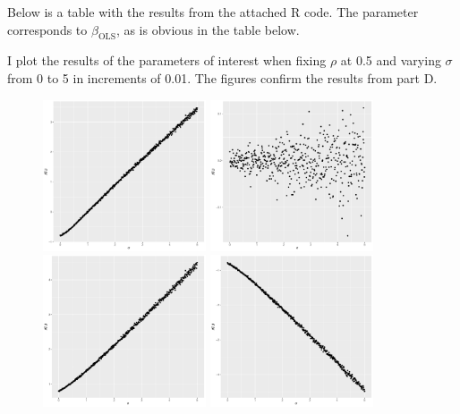 \documentclass{article}
\begin{document}
\begin{solution}
    
Below is a table with the results from the attached R code. The parameter corresponds to $\beta_\text{OLS}$, as is obvious in the table below.


I plot the results of the parameters of interest when fixing $\rho$ at 0.5 and varying $\sigma$ from 0 to 5 in increments of 0.01. The figures confirm the results from part D.

\begin{figure}[htb]
    \centering
    \includegraphics[width=0.43\textwidth]{ps1/Figures/p2_qe_beta.pdf}
    \includegraphics[width=0.43\textwidth]{ps1/Figures/p2_qe_ATE.pdf}
    \includegraphics[width=0.43\textwidth]{ps1/Figures/p2_qe_ATT.pdf}
    \includegraphics[width=0.43\textwidth]{ps1/Figures/p2_qe_ATU.pdf}

\end{figure}
\end{solution}
\end{document}

